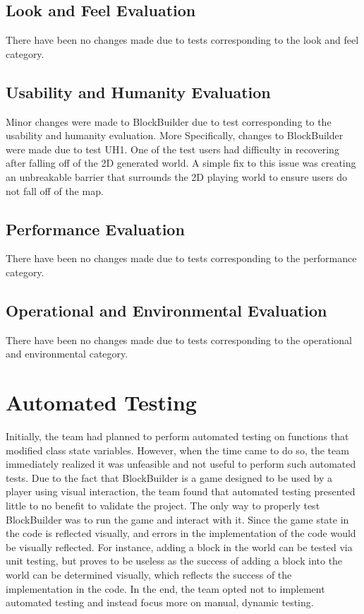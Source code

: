 \documentclass[12pt, titlepage]{article}
\begin{document}
\subsection{Look and Feel Evaluation}
There have been no changes made due to tests corresponding to the look and feel category.
\subsection{Usability and Humanity Evaluation}
Minor changes were made to BlockBuilder due to test corresponding to the usability and humanity evaluation. More Specifically, changes to BlockBuilder were made due to test UH1. One of the test users had difficulty in recovering after falling off of the 2D generated world. A simple fix to this issue was creating an unbreakable barrier that surrounds the 2D playing world to ensure users do not fall off of the map.
\subsection{Performance Evaluation}
There have been no changes made due to tests corresponding to the performance category.
\subsection{Operational and Environmental Evaluation}
There have been no changes made due to tests corresponding to the operational and environmental category.

\section{Automated Testing}
	Initially, the team had planned to perform automated testing on functions that modified class state variables. However, when the time came to do so, the team immediately realized it was unfeasible and not useful to perform such automated tests. Due to the fact that BlockBuilder is a game designed to be used by a player using visual interaction, the team found that automated testing presented little to no benefit to validate the project. The only way to properly test BlockBuilder was to run the game and interact with it. Since the game state in the code is reflected visually, and errors in the implementation of the code would be visually reflected. For instance, adding a block in the world can be tested via unit testing, but proves to be useless as the success of adding a block into the world can be determined visually, which reflects the success of the implementation in the code. In the end, the team opted not to implement automated testing and instead focus more on manual, dynamic testing.
\end{document}
